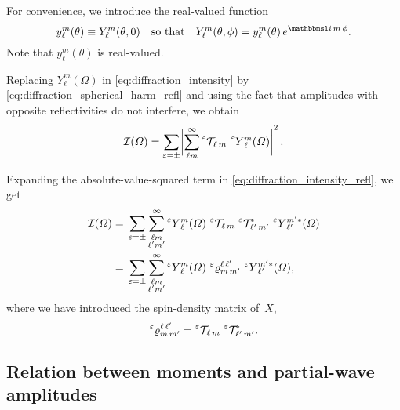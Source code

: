 For convenience, we introduce the real-valued function
\begin{equation}
  \label{eq:small_y_def}
  y_\ell^m(\theta)
  \equiv Y_\ell^m(\theta, 0)
  \quad\text{so that}\quad
  Y_\ell^m(\theta, \phi)
  = y_\ell^m(\theta)\, e^{\imag\, m\, \phi}.
\end{equation}
Note that $y_\ell^m(\theta)$ is real-valued.

Replacing $Y_\ell^m(\Omega)$ in \cref{eq:diffraction_intensity} by
\cref{eq:diffraction_spherical_harm_refl} and using the fact that
amplitudes with opposite reflectivities do not interfere, we obtain
\begin{equation}
  \label{eq:diffraction_intensity_refl}
  \mathcal{I}(\Omega)
  = \sum_{\refl = \pm} \Abs[3]{\sum_{\ell m}^\infty \prescript{\refl}{}{\mathcal{T\!}}_{\ell\, m}\, \prescript{\refl}{}{Y}_\ell^m(\Omega)}^2.
\end{equation}

Expanding the absolute-value-squared term in
\cref{eq:diffraction_intensity_refl}, we get
\begin{align}
  \mathcal{I}(\Omega)
  ={}& \sum_{\varepsilon = \pm} \sum_{\substack{\ell m \\ \ell' m'}}^\infty
  \prescript{\ensuremath{\varepsilon}}{}{Y}_\ell^m(\Omega)\,
  \prescript{\ensuremath{\varepsilon}}{}{\mathcal{T\!}}_{\ell\, m}\,
  \prescript{\ensuremath{\varepsilon}}{}{\mathcal{T\!}}_{\ell'\, m'}^*\,
  \prescript{\ensuremath{\varepsilon}}{}{Y}_{\ell'}^{m' *}(\Omega)
  \\
  \label{eq:diffraction_intensity_refl_spin-dens}
  ={}& \sum_{\varepsilon = \pm} \sum_{\substack{\ell m \\ \ell' m'}}^\infty
  \prescript{\ensuremath{\varepsilon}}{}{Y}_\ell^m(\Omega)\, \prescript{\ensuremath{\varepsilon}}{}{\varrho}^{\ell\, \ell'}_{m\, m'}\, \prescript{\ensuremath{\varepsilon}}{}{Y}_{\ell'}^{m' *}(\Omega),
\end{align}
where we have introduced the spin-density matrix of~$X$,
\begin{equation}
  \label{eq:diffraction_refl_spin-dens}
  \prescript{\ensuremath{\varepsilon}}{}{\varrho}^{\ell\, \ell'}_{m\, m'}
  = \prescript{\ensuremath{\varepsilon}}{}{\mathcal{T\!}}_{\ell\, m}\, \prescript{\ensuremath{\varepsilon}}{}{\mathcal{T\!}}_{\ell'\, m'}^*.
\end{equation}


\subsection{Relation between moments and partial-wave amplitudes}%
\label{sec:diffraction:moments_pw}

